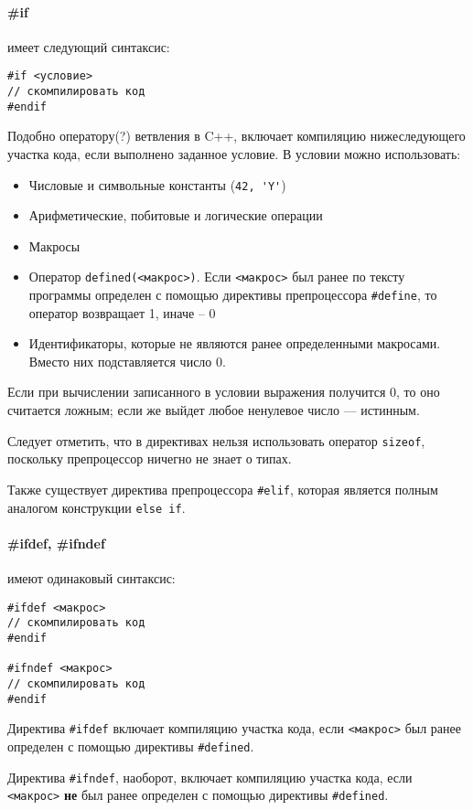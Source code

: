 \documentclass[14pt, a4paper]{extarticle}
\begin{document}
\paragraph{\#if} имеет следующий синтаксис:
\begin{verbatim}
#if <условие>
// скомпилировать код
#endif
\end{verbatim}
Подобно оператору(?) ветвления в C++, включает компиляцию нижеследующего
участка кода, если выполнено заданное условие. В условии можно использовать:
\begin{itemize}
  \item Числовые и символьные константы (\verb|42, 'Y'|)
  \item Арифметические, побитовые и логические операции
  \item Макросы
  \item Оператор \verb|defined(<макрос>)|. Если \verb|<макрос>| был ранее по тексту программы определен с помощью директивы препроцессора
  \verb|#define|, то оператор возвращает 1, иначе -- 0
  \item Идентификаторы, которые не являются ранее определенными макросами. Вместо них подставляется число 0.
\end{itemize}
Если при вычислении записанного в условии выражения получится 0, то оно считается ложным; если же выйдет любое ненулевое число --- истинным.

Следует отметить, что в директивах нельзя использовать оператор \verb|sizeof|, поскольку препроцессор ничегно не знает о типах.

Также существует директива препроцессора \verb|#elif|, которая является полным аналогом конструкции \verb|else if|.

\paragraph{\#ifdef, \#ifndef} имеют одинаковый синтаксис:
\begin{verbatim}
#ifdef <макрос>
// скомпилировать код
#endif

#ifndef <макрос>
// скомпилировать код
#endif
\end{verbatim}

Директива \verb|#ifdef| включает компиляцию участка кода, если \verb|<макрос>| был ранее определен с помощью директивы \verb|#defined|.

Директива \verb|#ifndef|, наоборот, включает компиляцию участка кода, если \verb|<макрос>| \textbf{не} был ранее определен
с помощью директивы \verb|#defined|.
\end{document}
